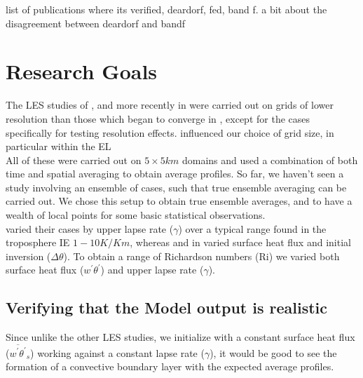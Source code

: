 list of publications where its verified, deardorf, fed, band f.  a bit about the disagreement between deardorf and bandf

\section{Research Goals}
\label{sec:ResearchGoals}

The LES studies of \citeauthor{SullMoengStev} \cite{SullMoengStev}, \citeauthor{FedConzMir04} \cite{FedConzMir04} and more recently \citeauthor{BrooksFowler2} in \cite{BrooksFowler2} were carried out on grids of lower resolution than those which began to converge in \citeauthor{SullPat} \cite{SullPat}, except for the cases specifically for testing resolution effects. \citeauthor{SullPat} \cite{SullPat} influenced our choice of grid size, in particular within the \acs{EL}\\

 All of these were carried out on $5 \times 5 km$ domains and used a combination of both time and spatial averaging to obtain average profiles.  So far, we haven't seen a study involving an ensemble of cases, such that true ensemble averaging can be carried out.  We chose this setup to obtain true ensemble averages, and to have a wealth of local points for some basic statistical observations.\\

\citeauthor{FedConzMir04} \cite{FedConzMir04} varied their cases by upper lapse rate ($\gamma$) over a typical range found in the troposphere IE $1 - 10 K / Km$, whereas \citeauthor{SullMoengStev} \cite{SullMoengStev} and \citeauthor{BrooksFowler2} in \cite{BrooksFowler2} varied surface heat flux and initial inversion ($\Delta \theta$).  To obtain a range of Richardson numbers (\acs{Ri}) we varied both surface heat flux ($w^{'}\theta^{'}$) and upper lapse rate ($\gamma$).\\

\subsection{Verifying that the Model output is realistic}

Since unlike the other LES studies, we initialize with a constant surface heat flux ($\overline{w^{'}\theta^{'}}_{s}$) working against a constant lapse rate ($\gamma$), it would be good to see the formation of a convective boundary layer with the expected average profiles.\\

